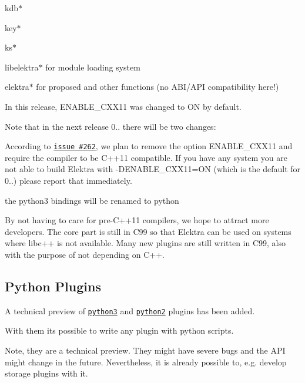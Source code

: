 \begin{DoxyItemize}
\item {\ttfamily kdb$\ast$}
\item {\ttfamily key$\ast$}
\item {\ttfamily ks$\ast$}
\item {\ttfamily libelektra$\ast$} for module loading system
\item {\ttfamily elektra$\ast$} for proposed and other functions (no A\+B\+I/\+A\+PI compatibility here!)
\end{DoxyItemize}

In this release, E\+N\+A\+B\+L\+E\+\_\+\+C\+X\+X11 was changed to {\ttfamily ON} by default.

Note that in the next release 0.. there will be two changes\+:


\begin{DoxyItemize}
\item According to \href{https://git.libelektra.org/issues/262}{\tt issue \#262}, we plan to remove the option E\+N\+A\+B\+L\+E\+\_\+\+C\+X\+X11 and require the compiler to be C++11 compatible. If you have any system you are not able to build Elektra with -\/\+D\+E\+N\+A\+B\+L\+E\+\_\+\+C\+X\+X11=ON (which is the default for 0..) please report that immediately.
\item the python3 bindings will be renamed to python
\end{DoxyItemize}

By not having to care for pre-\/\+C++11 compilers, we hope to attract more developers. The core part is still in C99 so that Elektra can be used on systems where libc++ is not available. Many new plugins are still written in C99, also with the purpose of not depending on C++.

\subsection*{Python Plugins}

A technical preview of \href{https://git.libelektra.org/blob/master/src/plugins/python}{\tt python3} and \href{https://git.libelektra.org/blob/master/src/plugins/python2}{\tt python2} plugins has been added.

With them its possible to write any plugin with python scripts.

Note, they are a technical preview. They might have severe bugs and the A\+PI might change in the future. Nevertheless, it is already possible to, e.\+g. develop storage plugins with it.

